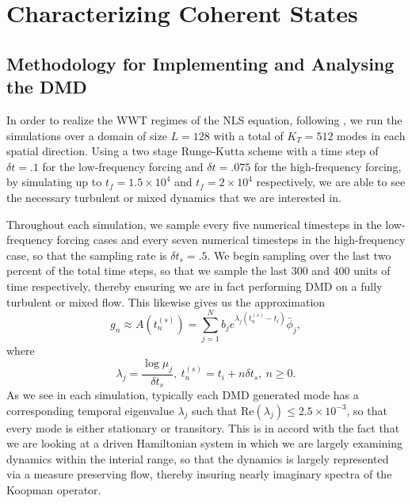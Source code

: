 \documentclass[aps,prl,preprint,groupedaddress]{revtex4-1}
\begin{document}
\section*{Characterizing Coherent States}

\subsection*{Methodology for Implementing and Analysing the DMD}

In order to realize the WWT regimes of the NLS equation, following \cite{nazarenko2}, we run the simulations over a domain of size $L=128$ with a total of $K_{T}=512$ modes in each spatial direction.  Using a two stage Runge-Kutta scheme with a time step of $\delta t=.1$ for the low-frequency forcing and $\delta t=.075$ for the high-frequency forcing, by simulating up to $t_{f}=1.5\times 10^{4}$ and $t_{f}=2\times 10^{4}$ respectively, we are able to see the necessary turbulent or mixed dynamics that we are interested in.  

Throughout each simulation, we sample every five numerical timesteps in the low-frequency forcing cases and every seven numerical timesteps in the high-frequency case, so that the sampling rate is $\delta t_{s}=.5$.  We begin sampling over the last two percent of the total time steps, so that we sample the last $300$ and $400$ units of time respectively, thereby ensuring we are in fact performing DMD on a fully turbulent or mixed flow.  This likewise gives us the approximation
\[
g_{n}\approx A\left(t^{(s)}_{n}\right) = \sum_{j=1}^{N} b_{j}e^{\lambda_{j}(t^{(s)}_{n}-t_{i})} \bar{\phi}_{j},  
\]
where
\[
\lambda_{j} = \frac{\log \mu_{j}}{\delta t_{s}}, ~ t^{(s)}_{n} = t_{i}  + n\delta t_{s}, ~ n\geq 0.
\]
As we see in each simulation, typically each DMD generated mode has a corresponding temporal eigenvalue $\lambda_{j}$ such that $\mbox{Re}\left(\lambda_{j}\right)\leq 2.5\times 10^{-3}$, so that every mode is either stationary or transitory.  This is in accord with the fact that we are looking at a driven Hamiltonian system in which we are largely examining dynamics within the interial range, so that the dynamics is largely represented via a measure preserving flow, thereby insuring nearly imaginary spectra of the Koopman operator.  
\end{document}
